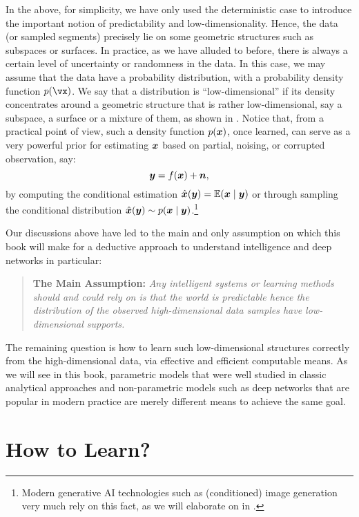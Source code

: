 \documentclass[../../book-main.tex]{subfiles}
\begin{document}
In the above, for simplicity, we have only used the deterministic case to introduce the important notion of predictability and low-dimensionality. Hence, the data (or sampled segments) precisely lie on some geometric structures such as subspaces or surfaces. In practice, as we have alluded to before, there is always a certain level of uncertainty or randomness in the data. In this case, we may assume that the data have a probability distribution, with a probability density function $p(\vx)$. We say that a distribution is ``low-dimensional'' if its density concentrates around a geometric structure that is rather low-dimensional, say a subspace, a surface or a mixture of them, as shown in . Notice that, from a practical point of view, such a density function $p(\bm{x})$, once learned, can serve as a very powerful prior for estimating $\bm{x}$ based on partial, noising, or corrupted observation, say: 
\begin{equation}
\bm{y} = f(\bm{x}) + \boldsymbol{n},
\end{equation}
by computing the conditional estimation $\hat{\bm{x}}(\bm{y}) = \mathbb{E}(\bm{x} \mid \bm{y})$ or through sampling the conditional distribution $\hat{\bm{x}}(\bm{y}) \sim p(\bm{x}\mid \bm{y})$.\footnote{Modern generative AI technologies such as (conditioned) image generation very much rely on this fact, as we will elaborate on in .}

Our discussions above have led to the main and only assumption on which this book will make for a deductive approach to understand  intelligence and deep networks in particular: 
\begin{quote}
\textbf{The Main Assumption:} {\em Any intelligent systems or learning methods should and could rely on is that the world is predictable hence the distribution of the observed high-dimensional data samples have low-dimensional supports.}     \end{quote}
The remaining question is how to learn such low-dimensional structures correctly from the high-dimensional data, via effective and efficient computable means. As we will see in this book, parametric models that were well studied in classic analytical approaches and non-parametric models such as deep networks that are popular in modern practice are merely different means to achieve the same goal.

\section{How to Learn?}
\end{document}
